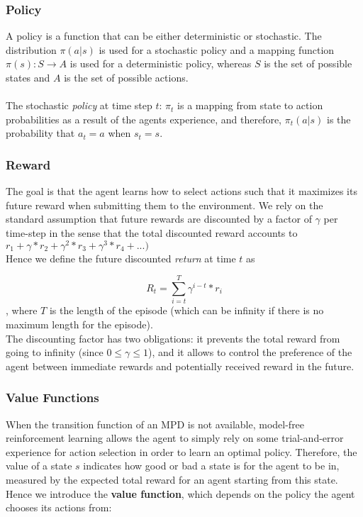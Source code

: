 \subsubsection{Policy}

A policy is a function that can be either deterministic or stochastic. 
The distribution $\pi(a|s)$ is used for a stochastic policy and a mapping function $\pi(s) : S \rightarrow A$ is used for a deterministic policy, whereas $S$ is the set of possible states and $A$ is the set of possible actions.
\\
\\
The stochastic \textit{policy} at time step $t$: $\pi_t$ is a mapping from state to action probabilities as a result of the agents experience, and therefore, $\pi_t(a|s)$ is the probability that $a_t=a$ when $s_t=s$.

\subsubsection{Reward}

The goal is that the agent learns how to select actions such that it maximizes its future reward when submitting them to the environment.
We rely on the standard assumption that future rewards are discounted by a factor of $\gamma$ per time-step in the sense that the total discounted reward accounts to $r_1 + \gamma*r_2 + \gamma^2*r_3 + \gamma^3*r_4 + ...)$
\\
Hence we define the future discounted \textit{return} at time $t$ as 

\begin{equation}\label{eq:discounted-return}
R_t=\sum_{i=t}^{T}{\gamma^{i-t}{*}r_{i}}
\end{equation}
, where $T$ is the length of the episode (which can be infinity if there is no maximum length for the episode).
\\
The discounting factor has two obligations: it prevents the total reward from going to infinity (since $0 \leq \gamma \leq 1$), and it allows to control the preference of the agent between immediate rewards and potentially received reward in the future. \cite{rl-demysitifed2}

\subsubsection{Value Functions}

When the transition function of an MPD is not available, model-free reinforcement learning allows the agent to simply rely on some trial-and-error experience for action selection in order to learn an optimal policy.
Therefore, the value of a state $s$ indicates how good or bad a state is for the agent to be in, measured by the expected total reward for an agent starting from this state. Hence we introduce the \textbf{value function}, which depends on the policy the agent chooses its actions from:

